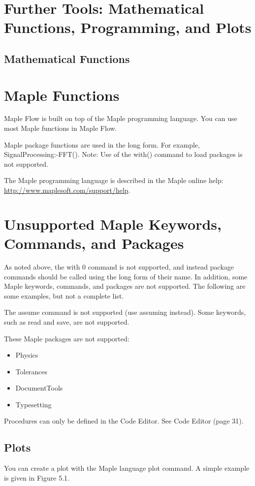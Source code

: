 \section{Further Tools: Mathematical Functions, Programming, and Plots}
\subsection{Mathematical Functions}
\section{Maple Functions}
Maple Flow is built on top of the Maple programming language. You can use most Maple functions in Maple Flow.

Maple package functions are used in the long form. For example, SignalProcessing:-FFT(). Note: Use of the with() command to load packages is not supported.

The Maple programming language is described in the Maple online help: \href{http://www.maplesoft.com/support/help}{http://www.maplesoft.com/support/help}.

\section{Unsupported Maple Keywords, Commands, and Packages}
As noted above, the with 0 command is not supported, and instead package commands should be called using the long form of their name. In addition, some Maple keywords, commands, and packages are not supported. The following are some examples, but not a complete list.

The assume command is not supported (use assuming instead). Some keywords, such as read and save, are not supported.

These Maple packages are not supported:

\begin{itemize}
  \item Physics

  \item Tolerances

  \item DocumentTools

  \item Typesetting

\end{itemize}

Procedures can only be defined in the Code Editor. See Code Editor (page 31).

\subsection{Plots}
You can create a plot with the Maple language plot command. A simple example is given in Figure 5.1.


